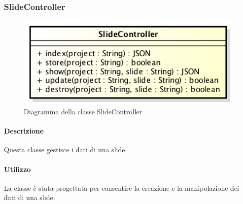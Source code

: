 \newpage
\subsubsection{SlideController}
\begin{figure}[h]
\centering
\includegraphics[width=0.5\linewidth]{img/back_end_http_controllers_slideController}
\caption[Diagramma della classe SlideController]{Diagramma della classe SlideController}
\label{fig:back_end_http_controllers_slideController}
\end{figure}

	\paragraph{Descrizione}
		Questa classe gestisce i dati di una slide.
	\paragraph{Utilizzo}
		La classe è stata progettata per consentire la creazione e la manipolazione dei dati di una slide.

